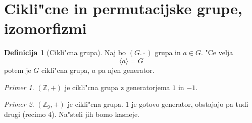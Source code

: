 \documentclass[11pt, a4paper]{article}
\theoremstyle{definition}
\newtheorem{defn}[counter]{Definicija}
\theoremstyle{remark}
\newtheorem*{ex}{Primer}
\newcommand{\Z}{\mathbb{Z}}
\begin{document}
	\section{Cikli"cne in permutacijske grupe, izomorfizmi}
	\begin{defn}[Cikli"cna grupa]
		Naj bo $(G. \cdot)$ grupa in $a \in G$. "Ce velja 
		\[ \langle a \rangle = G \]
		potem je $G$ cikli"cna grupa, $a$ pa njen generator.
	\end{defn}
	
	\begin{ex}
		$(\Z, +)$ je cikli"cna grupa z generatorjema $1$ in $-1$.
	\end{ex}

	\begin{ex}
		$(\Z_9, +)$ je cikli"cna grupa. $1$ je gotovo generator, obstajajo pa tudi drugi (recimo $4$). Na"steli jih bomo kasneje.
	\end{ex}
\end{document}
